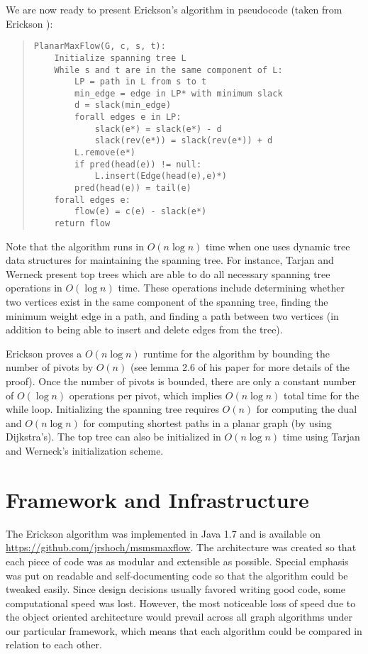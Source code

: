 \documentclass[12pt]{article}
\begin{document}
We are now ready to present Erickson's algorithm in pseudocode (taken from Erickson \cite{erickson2010}):
\begin{quote}
\begin{verbatim}
PlanarMaxFlow(G, c, s, t):
    Initialize spanning tree L
    While s and t are in the same component of L:
        LP = path in L from s to t
        min_edge = edge in LP* with minimum slack
        d = slack(min_edge)
        forall edges e in LP:
            slack(e*) = slack(e*) - d
            slack(rev(e*)) = slack(rev(e*)) + d
        L.remove(e*)
        if pred(head(e)) != null:
            L.insert(Edge(head(e),e)*)
        pred(head(e)) = tail(e)
    forall edges e:
        flow(e) = c(e) - slack(e*)
    return flow
\end{verbatim}
\end{quote}

Note that the algorithm runs in $O(n \log n)$ time when one uses dynamic tree data structures for maintaining the spanning tree. For instance, Tarjan and Werneck \cite{tarjanwerneck2005} present top trees which are able to do all necessary spanning tree operations in $O(\log n)$ time. These operations include determining whether two vertices exist in the same component of the spanning tree, finding the minimum weight edge in a path, and finding a path between two vertices (in addition to being able to insert and delete edges from the tree). 

Erickson proves a $O(n \log n)$ runtime for the algorithm by bounding the number of pivots by $O(n)$ (see lemma 2.6 of his paper for more details of the proof). Once the number of pivots is bounded, there are only a constant number of $O(\log n)$ operations per pivot, which implies $O(n \log n)$ total time for the while loop. Initializing the spanning tree requires $O(n)$ for computing the dual and $O(n \log n)$ for computing shortest paths in a planar graph (by using Dijkstra's). The top tree can also be initialized in $O(n \log n)$ time using Tarjan and Werneck's initialization scheme. 

\section{Framework and Infrastructure}

The Erickson algorithm was implemented in Java 1.7 and is available on \url{https://github.com/jrshoch/msmsmaxflow}. The architecture was created so that each piece of code was as modular and extensible as possible. Special emphasis was put on readable and self-documenting code so that the algorithm could be tweaked easily. Since design decisions usually favored writing good code, some computational speed was lost. However, the most noticeable loss of speed due to the object oriented architecture would prevail across all graph algorithms under our particular framework, which means that each algorithm could be compared in relation to each other.
\end{document}
